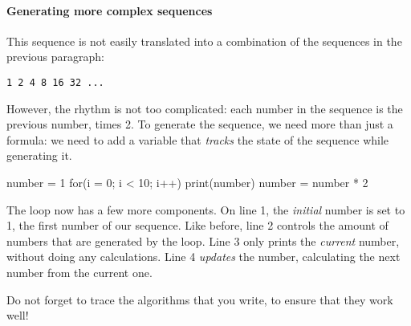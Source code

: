 \paragraph{Generating more complex sequences}

This sequence is not easily translated into a combination of the sequences in the previous paragraph:

\texttt{1 2 4 8 16 32 ...}

However, the rhythm is not too complicated: each number in the sequence is the previous number, times 2. To generate the sequence, we need more than just a formula: we need to add a variable that \emph{tracks} the state of the sequence while generating it.

\begin{nnflisting}
number = 1
for(i = 0; i < 10; i++)
    print(number)
    number = number * 2
\end{nnflisting}

The loop now has a few more components. On line 1, the \emph{initial} number is set to 1, the first number of our sequence. Like before, line 2 controls the amount of numbers that are generated by the loop. Line 3 only prints the \emph{current} number, without doing any calculations. Line 4 \emph{updates} the number, calculating the next number from the current one.

Do not forget to trace the algorithms that you write, to ensure that they work well!


